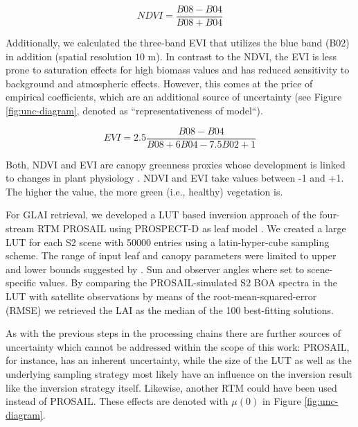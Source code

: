 \begin{equation}
\label{eq:ndvi}
NDVI  = \frac{B08 - B04}{B08 + B04}
\end{equation}

Additionally, we calculated the three-band \gls{EVI} \citep{huete_overview_2002} that utilizes the blue band (B02) in addition (spatial resolution $10$ m). In contrast to the NDVI, the \gls{EVI} is less prone to saturation effects for high biomass values and has reduced sensitivity to background and atmospheric effects. However, this comes at the price of empirical coefficients, which are an additional source of uncertainty (see Figure \ref{fig:unc-diagram}, denoted as ``representativeness of model``).

\begin{equation}
\label{eq:evi}
EVI  = 2.5 \frac{B08-B04}{B08 + 6B04 - 7.5B02 + 1}
\end{equation}

Both, \gls{NDVI} and \gls{EVI} are canopy greenness proxies whose development is linked to changes in plant physiology \citep{bolton_continental-scale_2020,kamenova_evaluation_2021}. \gls{NDVI} and \gls{EVI} take values between -1 and +1. The higher the value, the more green (i.e., healthy) vegetation is.

For \gls{GLAI} retrieval, we developed a \gls{LUT} based inversion approach of the four-stream RTM PROSAIL \citep{jacquemoud_prospectsail_2009} using PROSPECT-D as leaf model \citep{feret_prospect-d_2017}. We created a large \gls{LUT} for each \gls{S2} scene with 50000 entries using a latin-hyper-cube sampling scheme. The range of input leaf and canopy parameters were limited to upper and lower bounds suggested by \cite{danner_efficient_2021}. Sun and observer angles where set to scene-specific values. By comparing the PROSAIL-simulated \gls{S2} BOA spectra in the \gls{LUT} with satellite observations by means of the root-mean-squared-error (RMSE) we retrieved the LAI as the median of the 100 best-fitting solutions.

As with the previous steps in the processing chains there are further sources of uncertainty which cannot be addressed within the scope of this work: PROSAIL, for instance, has an inherent uncertainty, while the size of the \gls{LUT} as well as the underlying sampling strategy most likely have an influence on the inversion result like the inversion strategy itself. Likewise, another RTM could have been used instead of PROSAIL. These effects are denoted with $\mu(0)$ in Figure \ref{fig:unc-diagram}.

